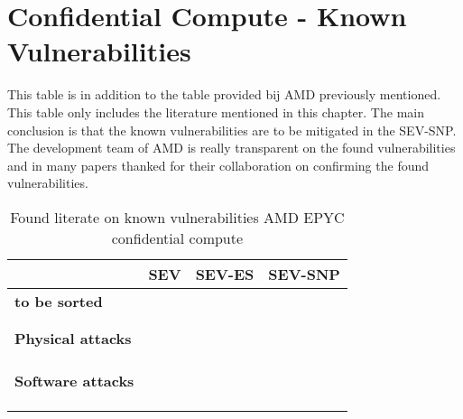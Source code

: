 
\section*{Confidential Compute - Known Vulnerabilities}

This table is in addition to the table provided bij AMD previously mentioned.
This table only includes the literature mentioned in this chapter. 
The main conclusion is that the known vulnerabilities 
are to be mitigated in the SEV-SNP. 
The development team of AMD is really transparent on the found vulnerabilities 
and in many papers thanked for their collaboration 
on confirming the found vulnerabilities. 

\begin{table}[ht]
\label{tab:lit}
\caption{Found literate on known vulnerabilities AMD EPYC confidential compute}
\centering
{
\footnotesize
  \begin{tabular}{|p{3.5cm}|p{3.5cm}|p{3.5cm}|p{3.5cm}|}
    \hline
     & \textbf{SEV} 
     & \textbf{SEV-ES} 
     & \textbf{SEV-SNP}\\
    \hline

    \textbf{to be sorted} 
    & \begin{minipage}[t]{7cm}
        \cite{hetzelt_security_2017}\\
        \cite{du_secure_2017} \\
        \cite{li_tlb_2021}
      \end{minipage}
    & \cite{li_tlb_2021} 
    & 
    \\

    \textbf{Physical attacks} 
    & \begin{minipage}[t]{7cm}
        \cite{li_exploiting_2019} \\
        \cite{buhren_insecure_2019} \\
        \cite{buhren_one_2021}
      \end{minipage}
    & \begin{minipage}[t]{7cm}
        \cite{wilke_sevurity_2020}\\
        \cite{buhren_one_2021} 
      \end{minipage}
    & \cite{buhren_one_2021}
    \\

    \textbf{Software attacks} 
    & \begin{minipage}[t]{7cm}
        \cite{morbitzer_severed_2018} \\
        \cite{2019-werner}\\
        \cite{hetzelt_via_2021}
      \end{minipage}
    & \begin{minipage}[t]{7cm}
        \cite{2019-werner}\\
        \cite{hetzelt_via_2021} 
       \end{minipage}
    & 
    \\


\end{tabular}}
\end{table}
